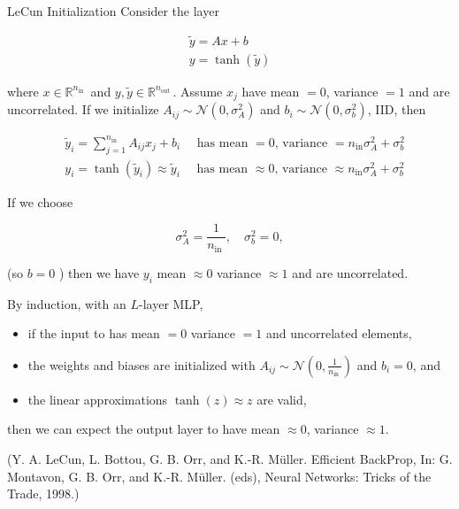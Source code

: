 \begin{frame}[allowframebreaks]

\begin{mydefinitionblock}{6.32}{LeCun Initialization}
    Consider the layer

    $$
    \begin{gathered}
    \tilde{y}=A x+b \\
    y=\tanh (\tilde{y})
    \end{gathered}
    $$

    where $x \in \mathbb{R}^{n_{\text {in }}}$ and $y, \tilde{y} \in \mathbb{R}^{n_{\text {out }}}$. Assume $x_{j}$ have mean $=0$, variance $=1$ and are uncorrelated. If we initialize $A_{i j} \sim \mathcal{N}\left(0, \sigma_{A}^{2}\right)$ and $b_{i} \sim \mathcal{N}\left(0, \sigma_{b}^{2}\right)$, IID, then

    $$
    \begin{aligned}
    & \tilde{y}_{i}=\sum_{j=1}^{n_{\mathrm{in}}} A_{i j} x_{j}+b_{i} \quad \text { has mean }=0 \text {, variance }=n_{\mathrm{in}} \sigma_{A}^{2}+\sigma_{b}^{2} \\
    & y_{i}=\tanh \left(\tilde{y}_{i}\right) \approx \tilde{y}_{i} \quad \text { has mean } \approx 0 \text {, variance } \approx n_{\mathrm{in}} \sigma_{A}^{2}+\sigma_{b}^{2}
    \end{aligned}
    $$

    If we choose

    $$
    \sigma_{A}^{2}=\frac{1}{n_{\text {in }}}, \quad \sigma_{b}^{2}=0,
    $$

    (so $b=0$ ) then we have $y_{i}$ mean $\approx 0$ variance $\approx 1$ and are uncorrelated.

    \par\noindent\textcolor{gray}{\hdashrule{\textwidth}{0.4pt}{1pt 2pt}}

    By induction, with an $L$-layer MLP,

    \begin{itemize}
        \item if the input to has mean $=0$ variance $=1$ and uncorrelated elements,
        \item the weights and biases are initialized with $A_{i j} \sim \mathcal{N}\left(0, \frac{1}{n_{\text {in }}}\right)$ and $b_{i}=0$, and
        \item the linear approximations $\tanh (z) \approx z$ are valid,
    \end{itemize}

    then we can expect the output layer to have mean $\approx 0$, variance $\approx 1$.

    (Y. A. LeCun, L. Bottou, G. B. Orr, and K.-R. Müller. Efficient BackProp, In: G. Montavon, G. B. Orr, and K.-R. Müller. (eds), Neural Networks: Tricks of the Trade, 1998.)
\end{mydefinitionblock}

\end{frame}

